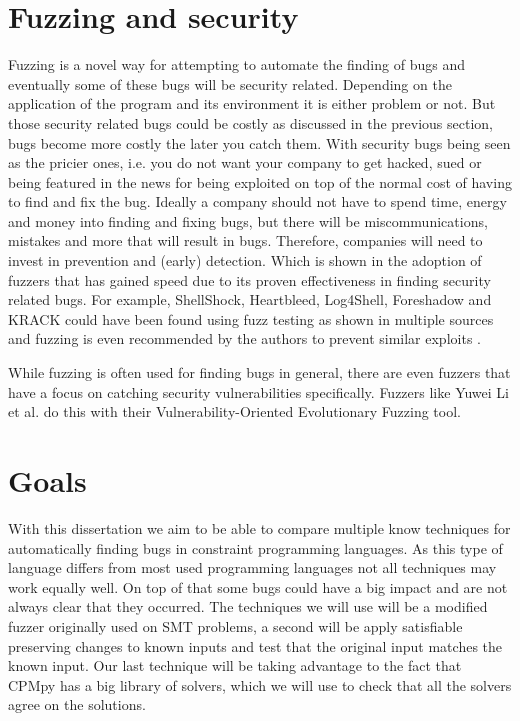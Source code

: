 \section{Fuzzing and security}
\label{intro:FussingSecurity}
Fuzzing is a novel way for attempting to automate the finding of bugs and eventually some of these bugs will be security related. Depending on the application of the program and its environment it is either problem or not. But those security related bugs could be costly as discussed in the previous section, bugs become more costly the later you 
catch them. With security bugs being seen as the pricier ones, i.e. you do not want your company to get hacked, sued or being featured in the news for being exploited on top of the normal cost of having to find and fix the bug. %
Ideally a company should not have to spend time, energy and money into finding and fixing bugs, but there will be miscommunications, mistakes and more that will result in bugs. Therefore, companies will need to invest in prevention and (early) detection. Which is shown in the adoption of fuzzers that has gained speed due to its proven effectiveness in finding security related bugs. For example, ShellShock, Heartbleed, Log4Shell, Foreshadow and KRACK could have been found using fuzz testing as shown in multiple sources \cite{HeartbleedViaFuzzing, 34ForeshadowViaFuzz, ShellShockViaFuzzing, Log4ShellViaFuzzing} and fuzzing is even recommended by the authors to prevent similar exploits \cite{35ForeshadowFuzzRecom, 33KrackViaFuzz}.

While fuzzing is often used for finding bugs in general, there are even fuzzers that have a focus on catching security vulnerabilities specifically. Fuzzers like Yuwei Li et al. \cite{32V-Fuzz} do this with their Vulnerability-Oriented Evolutionary Fuzzing tool.

\section{Goals}
With this dissertation we aim to be able to compare multiple know techniques for automatically finding bugs in constraint programming languages. As this type of language differs from most used programming languages not all techniques may work equally well. On top of that some bugs could have a big impact and are not always clear that they occurred.
The techniques we will use will be a modified fuzzer originally used on SMT problems, a second will be apply satisfiable preserving changes to known inputs and test that the original input matches the known input. Our last technique will be taking advantage to the fact that CPMpy has a big library of solvers, which we will use to check that all the solvers agree on the solutions.

